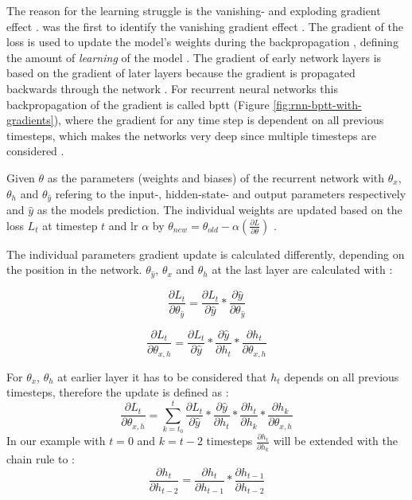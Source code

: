 \documentclass[11pt,
  paper=a4, 
  bibliography=totocnumbered,
	captions=tableheading,
	BCOR=10mm
]{scrreprt}
\theoremstyle{definition}
\newcommand{\figref}[1]{(Figure \ref{#1})}
\begin{document}
The reason for the learning struggle is the vanishing- and exploding gradient effect \cite{Hochreiter1998}.
\textcite{Hochreiter1991} was the first to identify the vanishing gradient effect \cite{Skansi2018}.
The gradient of the loss is used to update the model's weights during the backpropagation \cite{Lillicrap2019}, defining the amount of \textit{learning} of the model \cite{Suzuki2017, Skansi2018}.
The gradient of early network layers is based on the gradient of later layers because the gradient is propagated backwards through the network \cite{Skansi2018}.
For recurrent neural networks this backpropagation of the gradient is called \gls{bptt} \cite{Pascanu2013, Lillicrap2019} \figref{fig:rnn-bptt-with-gradients}, 
where the gradient for any time step is dependent on all previous timesteps, which makes the networks very deep since multiple timesteps are considered \cite{Skansi2018}.

Given $\theta$ as the parameters (weights and biases) of the recurrent network with $\theta_x$, $\theta_h$ and $\theta_{\hat{y}}$ refering to the input-, hidden-state- and output parameters respectively and $\hat{y}$ as the models prediction.
The individual weights are updated based on the loss $L_t$ at timestep $t$ and \gls{lr} $\alpha$ by $\theta_{new} = \theta_{old} - \alpha (\frac{\partial L}{\partial \theta})$ \cite{Rumelhart1986}.

The individual parameters gradient update is calculated differently, depending on the position in the network.
$\theta_{\hat{y}}$, $\theta_x$ and $\theta_h$ at the last layer are calculated with \cite{Hochreiter1998}:

\begin{equation}
	\frac{\partial L_t}{\partial \theta_{\hat{y}}} = \frac{\partial L_t}{\partial \hat{y}} * \frac{\partial \hat{y} }{ \partial \theta_{\hat{y}}}
\end{equation}

\begin{equation}
	\frac{\partial L_t}{\partial \theta_{x,h}} = \frac{\partial L_t}{\partial \hat{y}} * \frac{\partial \hat{y} }{ \partial h_t } * \frac{\partial h_t }{ \partial \theta_{x,h}}
\end{equation}

For $\theta_x$, $\theta_h$ at earlier layer it has to be considered that $h_t$ depends on all previous timesteps, therefore the update is defined as \cite{Hochreiter1998}:
\begin{equation}
	\frac{\partial L_t}{\partial \theta_{x,h}} =\sum_{k=t_0}^t \frac{\partial L_t}{\partial \hat{y}} * \frac{\partial \hat{y} }{ \partial h_t } * \frac{\partial h_t }{ \partial h_k }* \frac{\partial h_k }{ \partial \theta_{x,h}}
\end{equation}
In our example with $t=0$ and $k=t-2$  timesteps $\frac{\partial h_t }{ \partial h_k }$ will be extended with the chain rule to \cite{Britz2015}:
\begin{equation}
	\frac{\partial h_t }{ \partial h_{t-2}}= \frac{\partial h_t }{ \partial h_{t-1}}*\frac{\partial h_{t-1} }{ \partial h_{t-2}}
\end{equation}
\end{document}
